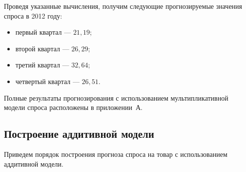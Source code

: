 \pagebreak

Проведя указанные вычисления, получим следующие прогнозируемые значения
спроса в 2012 году:

\begin{itemize}
  \item первый квартал --- $21{,}19$;
  \item второй квартал --- $26{,}29$;
  \item третий квартал --- $32{,}64$;
  \item четвертый квартал --- $26{,}51$.
\end{itemize}

Полные результаты прогнозирования с использованием мультипликативной
модели спроса расположены в приложении~А.


\subsection{Построение аддитивной модели}

Приведем порядок построения прогноза спроса на товар с использованием
аддитивной модели.

